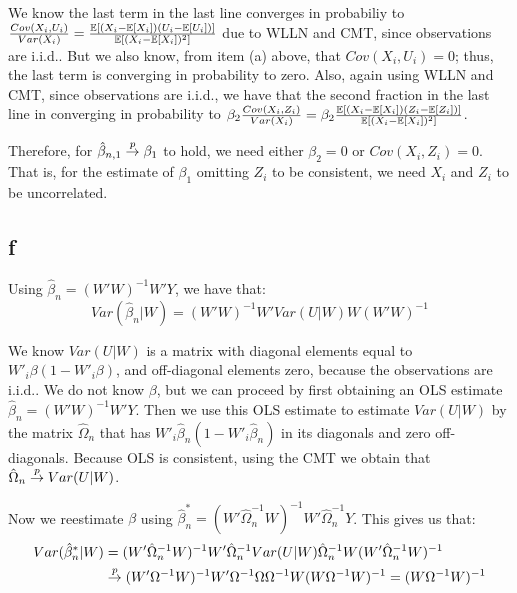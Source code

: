 \documentclass[12pt]{paper}
\begin{document}
We know the last term in the last line converges in probabiliy to $\frac{Cov(X_i,U_i)}{Var(X_i)}=\frac{\mathbb{E} \left [ (X_i-\mathbb{E} \left [ X_i \right ])(U_i-\mathbb{E} \left [ U_i \right ]) \right ]}{\mathbb{E} \left [ (X_i-\mathbb{E} \left [ X_i \right ])^2 \right ]}$ due to WLLN and CMT, since observations are i.i.d.. But we also know, from item (a) above, that $Cov(X_i,U_i)=0$; thus, the last term is converging in probability to zero. Also, again using WLLN and CMT, since observations are i.i.d., we have that the second fraction in the last line in converging in probability to $\beta_2\frac{Cov(X_i,Z_i)}{Var(X_i)}=\beta_2\frac{\mathbb{E} \left [ (X_i-\mathbb{E} \left [ X_i \right ])(Z_i-\mathbb{E} \left [ Z_i \right ]) \right ]}{\mathbb{E} \left [ (X_i-\mathbb{E} \left [ X_i \right ])^2 \right ]}$.

Therefore, for $\hat{\beta}_{n,1}\overset{p}{\to}\beta_1$ to hold, we need either $\beta_2=0$ or $Cov(X_i,Z_i)=0$. That is, for the estimate of $\beta_1$ omitting $Z_i$ to be consistent, we need $X_i$ and $Z_i$ to be uncorrelated.

\subsection*{f}

Using $\hat{\beta}_n=(W'W)^{-1}W'Y$, we have that:
\begin{equation}
Var(\hat{\beta}_n|W)=(W'W)^{-1}W'Var(U|W)W(W'W)^{-1}
\end{equation}

We know $Var(U|W)$ is a matrix with diagonal elements equal to $W'_i\beta(1-W'_i\beta)$, and off-diagonal elements zero, because the observations are i.i.d.. We do not know $\beta$, but we can proceed by first obtaining an OLS estimate $\hat{\beta}_n=(W'W)^{-1}W'Y$. Then we use this OLS estimate to estimate $Var(U|W)$ by the matrix $\hat{\Omega}_n$ that has $W'_i\hat{\beta}_n(1-W'_i\hat{\beta}_n)$ in its diagonals and zero off-diagonals. Because OLS is consistent, using the CMT we obtain that $\hat{\Omega}_n\overset{p}{\to} Var(U|W)$.

Now we reestimate $\beta$ using $\hat{\beta}_n^{*}=(W'\hat{\Omega}_n^{-1}W)^{-1}W'\hat{\Omega}_n^{-1}Y$. This gives us that:
\begin{equation}
\begin{split}
Var(\hat{\beta}_n^{*}|W)&=(W'\hat{\Omega}_n^{-1}W)^{-1}W'\hat{\Omega}_n^{-1}Var(U|W)\hat{\Omega}_n^{-1}W(W'\hat{\Omega}_n^{-1}W)^{-1}\\
&\overset{p}{\to} (W'\Omega^{-1}W)^{-1}W'\Omega^{-1}\Omega\Omega^{-1}W(W\Omega^{-1}W)^{-1}=(W\Omega^{-1}W)^{-1}
\end{split}
\end{equation}
\end{document}
